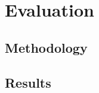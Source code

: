 
\chapter{Evaluation}
\label{chapter:evaluation}

\section{Methodology}
\label{sec:methodology}

\section{Results}
\label{sec:results}
